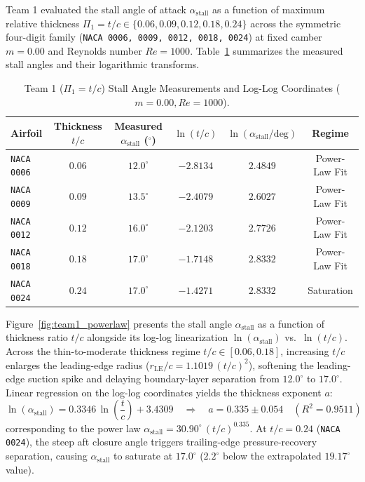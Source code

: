 \documentclass[11pt,a4paper]{article}
\begin{document}
Team 1 evaluated the stall angle of attack $\alpha_{\text{stall}}$ as a function of maximum relative thickness $\Pi_1 = t/c \in \{0.06, 0.09, 0.12, 0.18, 0.24\}$ across the symmetric four-digit family (\texttt{NACA 0006, 0009, 0012, 0018, 0024}) at fixed camber $m = 0.00$ and Reynolds number $Re = 1000$. Table~\ref{tab:team1} summarizes the measured stall angles and their logarithmic transforms.

\begin{table}[H]
\centering
\small
\renewcommand{\arraystretch}{1.18}
\caption{Team 1 ($\Pi_1 = t/c$) Stall Angle Measurements and Log-Log Coordinates ($m = 0.00, Re = 1000$).}
\label{tab:team1}
\begin{tabular}{@{}lccccc@{}}
\toprule
\textbf{Airfoil} & \textbf{Thickness $t/c$} & \textbf{Measured $\alpha_{\text{stall}}$ ($^\circ$)} & $\ln(t/c)$ & $\ln(\alpha_{\text{stall}}/\text{deg})$ & \textbf{Regime} \\ \midrule
\texttt{NACA 0006} & $0.06$ & $12.0^\circ$ & $-2.8134$ & $2.4849$ & Power-Law Fit \\
\texttt{NACA 0009} & $0.09$ & $13.5^\circ$ & $-2.4079$ & $2.6027$ & Power-Law Fit \\
\texttt{NACA 0012} & $0.12$ & $16.0^\circ$ & $-2.1203$ & $2.7726$ & Power-Law Fit \\
\texttt{NACA 0018} & $0.18$ & $17.0^\circ$ & $-1.7148$ & $2.8332$ & Power-Law Fit \\
\texttt{NACA 0024} & $0.24$ & $17.0^\circ$ & $-1.4271$ & $2.8332$ & Saturation \\ \bottomrule
\end{tabular}
\end{table}

Figure~\ref{fig:team1_powerlaw} presents the stall angle $\alpha_{\text{stall}}$ as a function of thickness ratio $t/c$ alongside its log-log linearization $\ln(\alpha_{\text{stall}})$ vs.\ $\ln(t/c)$. Across the thin-to-moderate thickness regime $t/c \in [0.06, 0.18]$, increasing $t/c$ enlarges the leading-edge radius ($r_{\text{LE}}/c = 1.1019\,(t/c)^2$), softening the leading-edge suction spike and delaying boundary-layer separation from $12.0^\circ$ to $17.0^\circ$. Linear regression on the log-log coordinates yields the thickness exponent $a$:
\begin{equation}
    \ln(\alpha_{\text{stall}}) = 0.3346\,\ln\!\left(\frac{t}{c}\right) + 3.4309 \quad \Longrightarrow \quad \boxed{a = 0.335 \pm 0.054 \quad (R^2 = 0.9511)}
\end{equation}
corresponding to the power law $\alpha_{\text{stall}} = 30.90^\circ\,(t/c)^{0.335}$. At $t/c = 0.24$ (\texttt{NACA 0024}), the steep aft closure angle triggers trailing-edge pressure-recovery separation, causing $\alpha_{\text{stall}}$ to saturate at $17.0^\circ$ ($2.2^\circ$ below the extrapolated $19.17^\circ$ value).
\end{document}
